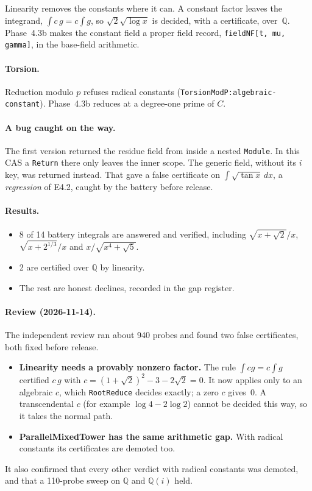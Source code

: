 \documentclass[11pt]{article}
\theoremstyle{definition}
\theoremstyle{remark}
\newcommand{\Q}{\mathbb{Q}}
\newcommand{\code}[1]{\texttt{#1}}
\begin{document}
Linearity removes the constants where it can. A constant factor leaves the
integrand, $\int c\,g=c\int g$, so $\sqrt2\sqrt{\log x}$ is decided, with a
certificate, over~$\Q$. Phase~4.3b makes the constant field a proper field record,
\code{fieldNF[t, mu, gamma]}, in the base-field arithmetic.

\paragraph{Torsion.} Reduction modulo $p$ refuses radical constants
(\code{TorsionModP:algebraic-constant}). Phase~4.3b reduces at a degree-one
prime of $C$.

\paragraph{A bug caught on the way.} The first version returned the residue
field from inside a nested \code{Module}. In this CAS a \code{Return} there only
leaves the inner scope. The generic field, without its $i$ key, was returned
instead. That gave a false certificate on $\int\sqrt{\tan x}\,dx$, a
\emph{regression} of E4.2, caught by the battery before release.

\paragraph{Results.}
\begin{itemize}
\item 8 of 14 battery integrals are answered and verified, including
  $\sqrt{x+\sqrt2}/x$, $\sqrt{x+2^{1/3}}/x$ and $x/\sqrt{x^4+\sqrt5}$.
\item 2 are certified over $\Q$ by linearity.
\item The rest are honest declines, recorded in the gap register.
\end{itemize}

\paragraph{Review (2026-11-14).} The independent review ran about 940 probes and
found two false certificates, both fixed before release.
\begin{itemize}
\item \textbf{Linearity needs a provably nonzero factor.} The rule
  $\int cg=c\int g$ certified $c\,g$ with $c=(1+\sqrt2)^2-3-2\sqrt2=0$. It now
  applies only to an algebraic $c$, which \code{RootReduce} decides exactly; a
  zero $c$ gives~$0$. A transcendental $c$ (for example $\log4-2\log2$) cannot be
  decided this way, so it takes the normal path.
\item \textbf{ParallelMixedTower has the same arithmetic gap.} With radical
  constants its certificates are demoted too.
\end{itemize}
It also confirmed that every other verdict with radical constants was demoted,
and that a 110-probe sweep on $\Q$ and $\Q(i)$ held.
\end{document}
